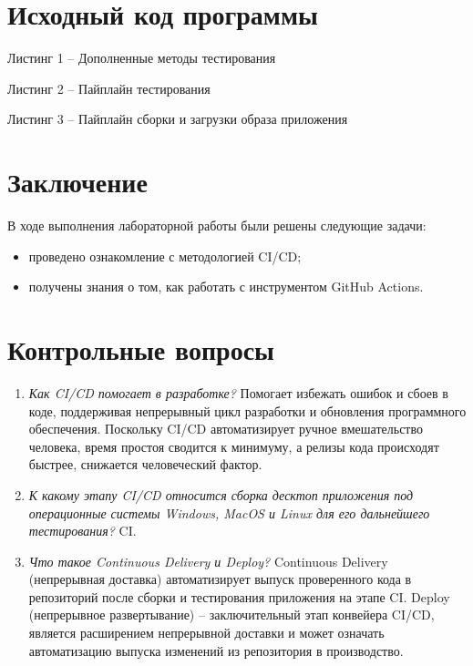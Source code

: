 \section*{Исходный код программы}

%

Листинг 1 -- Дополненные методы тестирования   


Листинг 2 -- Пайплайн тестирования

%

Листинг 3 -- Пайплайн сборки и загрузки образа приложения

\section*{Заключение}

В ходе выполнения лабораторной работы были решены следующие задачи:
\begin{itemize}
	\item проведено ознакомление с методологией CI/CD; 
	\item получены знания о том, как работать с инструментом GitHub Actions. 
\end{itemize}

\section*{Контрольные вопросы}

\begin{enumerate}
	\item \textit{Как CI/CD помогает в разработке?} Помогает избежать ошибок и сбоев в коде, поддерживая непрерывный цикл разработки и обновления программного обеспечения. Поскольку CI/CD автоматизирует ручное вмешательство человека, время простоя сводится к минимуму, а релизы кода происходят быстрее, снижается человеческий фактор.
	\item \textit{К какому этапу CI/CD относится сборка десктоп приложения под операционные системы Windows, MacOS и Linux для его дальнейшего тестирования?} CI.
	\item \textit{Что такое Continuous Delivery и Deploy?} Continuous Delivery (непрерывная доставка) автоматизирует выпуск проверенного кода в репозиторий после сборки и тестирования приложения на этапе CI. Deploy (непрерывное развертывание) -- заключительный этап конвейера CI/CD, является расширением непрерывной доставки и может означать автоматизацию выпуска изменений из репозитория в производство.
\end{enumerate}
